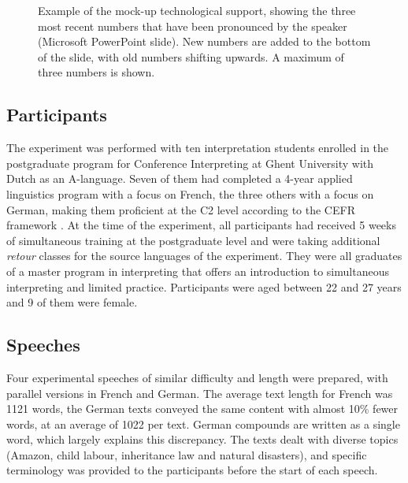 \documentclass[output=paper]{langsci/langscibook}
\begin{document}
\begin{figure}
\caption{Example of the mock-up technological support, showing the three most recent numbers that have been pronounced by the speaker (Microsoft PowerPoint slide). New numbers are added to the bottom of the slide, with old numbers shifting upwards. A maximum of three numbers is shown.\label{fig:01:1}}
\end{figure}

\subsection{Participants}

The experiment was performed with ten interpretation students enrolled in the postgraduate program for Conference Interpreting at Ghent University with Dutch as an A-language. Seven of them had completed a 4-year applied linguistics program with a focus on French, the three others with a focus on German, making them proficient at the C2 level according to the \textsc{CEFR} framework \citep{Council2001}. At the time of the experiment, all participants had received 5 weeks of simultaneous training at the postgraduate level and were taking additional \textit{retour} classes for the source languages of the experiment. They were all graduates of a master program in interpreting that offers an introduction to simultaneous interpreting and limited practice. Participants were aged between 22 and 27 years and 9 of them were female. 

\subsection{Speeches}

Four experimental speeches of similar difficulty and length were prepared, with parallel versions in French and German. The average text length for French was 1121 words, the German texts conveyed the same content with almost 10\% fewer words, at an average of 1022 per text. German compounds are written as a single word, which largely explains this discrepancy. The texts dealt with diverse topics (Amazon, child labour, inheritance law and natural disasters), and specific terminology was provided to the participants before the start of each speech.
\end{document}
